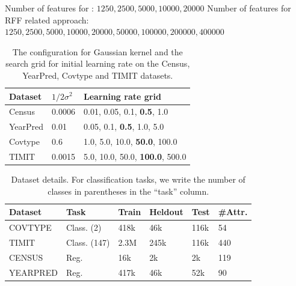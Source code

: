 Number of features for \Nystrom: $1250, 2500, 5000, 10000, 20000$
Number of features for RFF related approach: $1250, 2500, 5000, 10000, 20000, 50000, 100000, 200000, 400000$

\begin{table}
	\caption{The configuration for Gaussian kernel and the search grid for initial learning rate on the Census, YearPred, Covtype and TIMIT datasets.}
	\label{tab:hyperparam}
	\begin{center}
	\begin{tabular}{lll}
	\toprule
	Dataset & $1/2\sigma^2$ & Learning rate grid \\
	\midrule
Census & 0.0006 & {0.01, 0.05, 0.1, \textbf{0.5}, 1.0} \\
YearPred & 0.01 & {0.05, 0.1, \textbf{0.5}, 1.0, 5.0} \\
Covtype & 0.6 & {1.0, 5.0, 10.0, \textbf{50.0}, 100.0} \\
TIMIT & 0.0015 & {5.0, 10.0, 50.0, \textbf{100.0}, 500.0} \\
	\bottomrule
	\end{tabular}
	\end{center}
\end{table}

\begin{table}
	\caption{Dataset details.  For classification tasks, we write the number
		of classes in parentheses in the ``task'' column.}
	\label{tab:datasets}
	\begin{center}
		\begin{tabular}{llllll} 
			\toprule
			\textbf{Dataset}  & \textbf{Task} & \textbf{Train} & \textbf{Heldout} & \textbf{Test} & \textbf{\#Attr.} \\ 
			\midrule
			COVTYPE  & Class. (2) & 418k  & 46k     & 116k & 54  \\ 
			TIMIT    & Class. (147) & 2.3M  & 245k    & 116k & 440 \\
			CENSUS   & Reg.   & 16k   & 2k      & 2k   & 119 \\ 
			YEARPRED & Reg.   & 417k  & 46k     & 52k  & 90  \\ 
			\bottomrule
		\end{tabular}

	\end{center}
\end{table}


